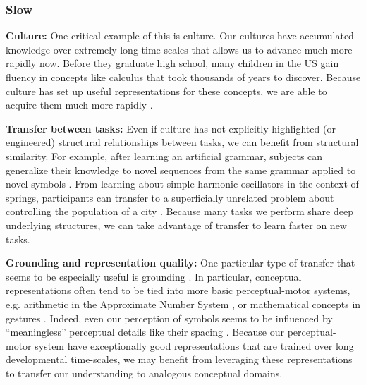 \documentclass[11pt]{article}
\begin{document}
\subsubsection{Slow}
\textbf{Culture:} One critical example of this is culture. Our cultures have accumulated knowledge over extremely long time scales that allows us to advance much more rapidly now. Before they graduate high school, many children in the US gain fluency in concepts like calculus that took thousands of years to discover. Because culture has set up useful representations for these concepts, we are able to acquire them much more rapidly \citep{McClelland2016}. \par 
\textbf{Transfer between tasks:} Even if culture has not explicitly highlighted (or engineered) structural relationships between tasks, we can benefit from structural similarity. For example, after learning an artificial grammar, subjects can generalize their knowledge to novel sequences from the same grammar applied to novel symbols \citep[e.g.]{Tunney2001}. From learning about simple harmonic oscillators in the context of springs, participants can transfer to a superficially unrelated problem about controlling the population of a city \citep[e.g.]{Day2011}. Because many tasks we perform share deep underlying structures, we can take advantage of transfer to learn faster on new tasks. \par 
\textbf{Grounding and representation quality:} One particular type of transfer that seems to be especially useful is grounding \citep{Barsalou2007}. In particular, conceptual representations often tend to be tied into more basic perceptual-motor systems, e.g. arithmetic in the Approximate Number System \citep{Park2013}, or mathematical concepts in gestures \citep{Goldin-Meadow1993}. Indeed, even our perception of symbols seems to be influenced by ``meaningless'' perceptual details like their spacing \citep{Landy2007}. Because our perceptual-motor system have exceptionally good representations that are trained over long developmental time-scales, we may benefit from leveraging these representations to transfer our understanding to analogous conceptual domains. \par 
\end{document}
